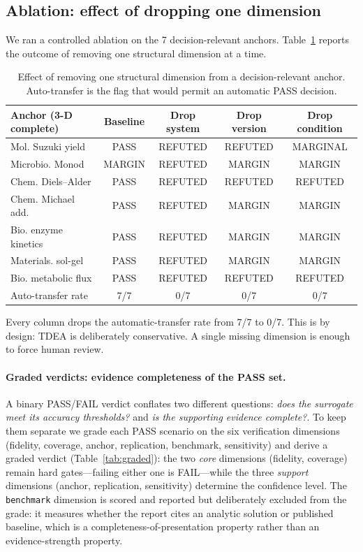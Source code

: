 \documentclass[review,3p]{elsarticle}
\begin{document}
\subsection{Ablation: effect of dropping one dimension}
\label{sec:ablation}

We ran a controlled ablation on the 7 decision-relevant anchors. Table~\ref{tab:ablation} reports the outcome of removing one structural dimension at a time.

\begin{table}[h]
    \centering
    \caption{Effect of removing one structural dimension from a decision-relevant anchor. Auto-transfer is the flag that would permit an automatic PASS decision.}
    \label{tab:ablation}
    \begin{tabular}{l c c c c}
        \toprule
        Anchor (3-D complete) & Baseline & Drop system & Drop version & Drop condition \\
        \midrule
        Mol. Suzuki yield   & PASS & REFUTED & REFUTED & MARGINAL \\
        Microbio. Monod     & MARGIN & REFUTED & MARGIN & MARGIN \\
        Chem. Diels--Alder  & PASS & REFUTED & REFUTED & REFUTED \\
        Chem. Michael add.  & PASS & REFUTED & MARGIN & MARGIN \\
        Bio. enzyme kinetics& PASS & REFUTED & MARGIN & MARGIN \\
        Materials. sol-gel  & PASS & REFUTED & MARGIN & MARGIN \\
        Bio. metabolic flux & PASS & REFUTED & REFUTED & REFUTED \\
        \midrule
        Auto-transfer rate  & 7/7    & 0/7     & 0/7     & 0/7     \\
        \bottomrule
    \end{tabular}
\end{table}

Every column drops the automatic-transfer rate from 7/7 to 0/7. This is by design: TDEA is deliberately conservative. A single missing dimension is enough to force human review.

\paragraph{Graded verdicts: evidence completeness of the PASS set.}
A binary PASS/FAIL verdict conflates two different questions: \emph{does the surrogate meet its accuracy thresholds?} and \emph{is the supporting evidence complete?}. To keep them separate we grade each PASS scenario on the six verification dimensions (fidelity, coverage, anchor, replication, benchmark, sensitivity) and derive a graded verdict (Table~\ref{tab:graded}): the two \emph{core} dimensions (fidelity, coverage) remain hard gates---failing either one is FAIL---while the three \emph{support} dimensions (anchor, replication, sensitivity) determine the confidence level. The \texttt{benchmark} dimension is scored and reported but deliberately excluded from the grade: it measures whether the report cites an analytic solution or published baseline, which is a completeness-of-presentation property rather than an evidence-strength property.
\end{document}
